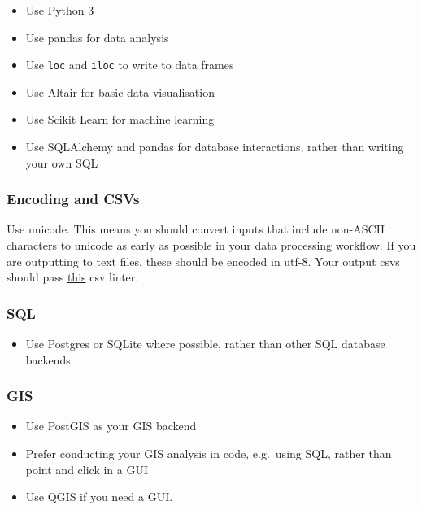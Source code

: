 \documentclass[]{book}
\providecommand{\tightlist}{%
  \setlength{\itemsep}{0pt}\setlength{\parskip}{0pt}}
\begin{document}
\begin{itemize}
\tightlist
\item
  Use Python 3
\item
  Use pandas for data analysis
\item
  Use \texttt{loc} and \texttt{iloc} to write to data frames
\item
  Use Altair for basic data visualisation
\item
  Use Scikit Learn for machine learning
\item
  Use SQLAlchemy and pandas for database interactions, rather than writing your own SQL
\end{itemize}

\hypertarget{encoding-and-csvs}{%
\subsubsection*{Encoding and CSVs}\label{encoding-and-csvs}}

Use unicode. This means you should convert inputs that include non-ASCII characters to unicode as early as possible in your data processing workflow. If you are outputting to text files, these should be encoded in utf-8. Your output csvs should pass \href{https://csvlint.io/}{this} csv linter.

\hypertarget{sql}{%
\subsubsection*{SQL}\label{sql}}

\begin{itemize}
\tightlist
\item
  Use Postgres or SQLite where possible, rather than other SQL database backends.
\end{itemize}

\hypertarget{gis}{%
\subsubsection*{GIS}\label{gis}}

\begin{itemize}
\tightlist
\item
  Use PostGIS as your GIS backend
\item
  Prefer conducting your GIS analysis in code, e.g.~using SQL, rather than point and click in a GUI
\item
  Use QGIS if you need a GUI.
\end{itemize}
\end{document}
